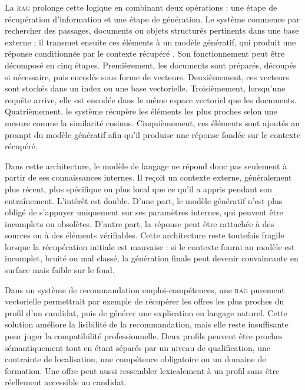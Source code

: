 \documentclass[12pt,twoside]{report}
\newcommand{\RAG}{\textsc{rag}}
\begin{document}
La \RAG{} prolonge cette logique en combinant deux opérations : une étape de récupération d'information et une étape de génération. Le système commence par rechercher des passages, documents ou objets structurés pertinents dans une base externe ; il transmet ensuite ces éléments à un modèle génératif, qui produit une réponse conditionnée par le contexte récupéré \cite{lewis2020rag}. Son fonctionnement peut être décomposé en cinq étapes. Premièrement, les documents sont préparés, découpés si nécessaire, puis encodés sous forme de vecteurs. Deuxièmement, ces vecteurs sont stockés dans un index ou une base vectorielle. Troisièmement, lorsqu'une requête arrive, elle est encodée dans le même espace vectoriel que les documents. Quatrièmement, le système récupère les éléments les plus proches selon une mesure comme la similarité cosinus. Cinquièmement, ces éléments sont ajoutés au prompt du modèle génératif afin qu'il produise une réponse fondée sur le contexte récupéré.

Dans cette architecture, le modèle de langage ne répond donc pas seulement à partir de ses connaissances internes. Il reçoit un contexte externe, généralement plus récent, plus spécifique ou plus local que ce qu'il a appris pendant son entraînement. L'intérêt est double. D'une part, le modèle génératif n'est plus obligé de s'appuyer uniquement sur ses paramètres internes, qui peuvent être incomplets ou obsolètes. D'autre part, la réponse peut être rattachée à des sources ou à des éléments vérifiables. Cette architecture reste toutefois fragile lorsque la récupération initiale est mauvaise : si le contexte fourni au modèle est incomplet, bruité ou mal classé, la génération finale peut devenir convaincante en surface mais faible sur le fond.

Dans un système de recommandation emploi-compétences, une \RAG{} purement vectorielle permettrait par exemple de récupérer les offres les plus proches du profil d'un candidat, puis de générer une explication en langage naturel. Cette solution améliore la lisibilité de la recommandation, mais elle reste insuffisante pour juger la compatibilité professionnelle. Deux profils peuvent être proches sémantiquement tout en étant séparés par un niveau de qualification, une contrainte de localisation, une compétence obligatoire ou un domaine de formation. Une offre peut aussi ressembler lexicalement à un profil sans être réellement accessible au candidat.
\end{document}
